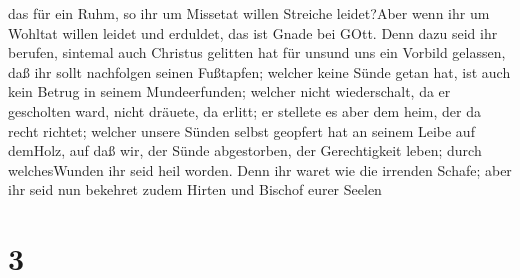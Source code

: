 das für ein Ruhm, so ihr um Missetat willen Streiche leidet?Aber wenn
ihr um Wohltat willen leidet und erduldet, das ist Gnade bei GOtt.
 Denn dazu seid ihr berufen, sintemal auch Christus
gelitten hat für unsund uns ein Vorbild gelassen, daß ihr sollt
nachfolgen seinen Fußtapfen;  welcher keine Sünde getan
hat, ist auch kein Betrug in seinem Mundeerfunden;  welcher
nicht wiederschalt, da er gescholten ward, nicht dräuete, da erlitt; er
stellete es aber dem heim, der da recht richtet;  welcher
unsere Sünden selbst geopfert hat an seinem Leibe auf demHolz, auf daß
wir, der Sünde abgestorben, der Gerechtigkeit leben; durch welchesWunden
ihr seid heil worden.  Denn ihr waret wie die irrenden
Schafe; aber ihr seid nun bekehret zudem Hirten und Bischof eurer Seelen

\hypertarget{section-2}{%
\section{3}\label{section-2}}

